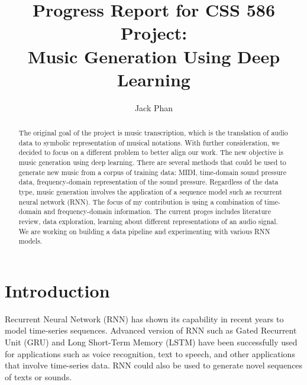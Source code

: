 \documentclass[sigconf,authorversion]{acmart}
\begin{document}
\renewcommand\footnotetextcopyrightpermission[1]{}
\pagestyle{plain}
\title{Progress Report for CSS 586 Project: \\
Music Generation Using Deep Learning}


\author{Jack Phan}

\begin{abstract}

The original goal of the project is music transcription, which is the translation of audio data
to symbolic representation of musical notations. With further consideration, we decided to focus on 
a different problem to better align our work. The new objective is music generation using deep learning.
There are several methods that could be used to generate new music from a corpus of training data: MIDI, 
time-domain sound pressure data, frequency-domain representation of the sound pressure. Regardless of the 
data type, music generation involves the application of a sequence model such as recurrent neural network 
(RNN). The focus of my contribution is using a combination of time-domain and frequency-domain information. 
The current proges includes literature review, data exploration, learning about different representations 
of an audio signal. We are working on building a data pipeline and experimenting with various RNN models.
\end{abstract}


\maketitle

\section{Introduction}

Recurrent Neural Network (RNN) has shown its capability in recent years to model time-series sequences. 
Advanced version of RNN such as Gated Recurrent Unit (GRU) and Long Short-Term Memory (LSTM) have been 
successfully used for applications such as voice recognition, text to speech, and other applications 
that involve time-series data. RNN could also be used to generate novel sequences of texts or sounds.
\end{document}
